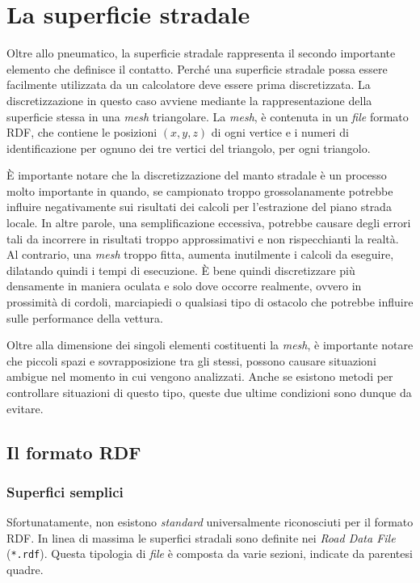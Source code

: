 \chapter{La superficie stradale}
\label{rdf}
%
Oltre allo pneumatico, la superficie stradale rappresenta il secondo importante elemento che definisce il contatto. Perché una superficie stradale possa essere facilmente utilizzata da un calcolatore deve essere prima discretizzata. La discretizzazione in questo caso avviene mediante la rappresentazione della superficie stessa in una \textit{mesh} triangolare. La \textit{mesh}, è contenuta in un \textit{file} formato \ac{RDF}, che contiene le posizioni $(x,y,z)$ di ogni vertice e i numeri di identificazione per ognuno dei tre vertici del triangolo, per ogni triangolo.

È importante notare che la discretizzazione del manto stradale è un processo molto importante in quando, se campionato troppo grossolanamente potrebbe influire negativamente sui risultati dei calcoli per l'estrazione del piano strada locale. In altre parole, una semplificazione eccessiva, potrebbe causare degli errori tali da incorrere in risultati troppo approssimativi e non rispecchianti la realtà. Al contrario, una \textit{mesh} troppo fitta, aumenta inutilmente i calcoli da eseguire, dilatando quindi i tempi di esecuzione. È bene quindi discretizzare più densamente in maniera oculata e solo dove occorre realmente, ovvero in prossimità di cordoli, marciapiedi o qualsiasi tipo di ostacolo che potrebbe influire sulle performance della vettura.

Oltre alla dimensione dei singoli elementi costituenti la \textit{mesh}, è importante notare che piccoli spazi e sovrapposizione tra gli stessi, possono causare situazioni ambigue nel momento in cui vengono analizzati. Anche se esistono metodi per controllare situazioni di questo tipo, queste due ultime condizioni sono dunque da evitare.
%
\section{Il formato RDF}
%
\subsection{Superfici semplici}
Sfortunatamente, non esistono \textit{standard} universalmente riconosciuti per il formato RDF. In linea di massima le superfici stradali sono definite nei \textit{Road Data File} (\texttt{*.rdf}). Questa tipologia di \textit{file} è composta da varie sezioni, indicate da parentesi quadre.

